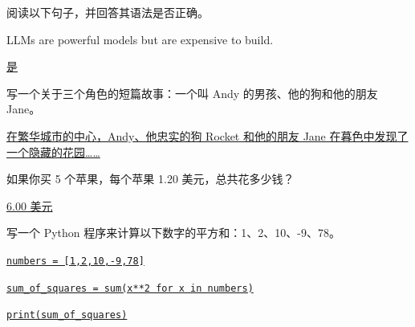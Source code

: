 \vspace{0.5em}
\begin{tcolorbox}
\begin{center}
\parbox{0.9\textwidth}{
{\color{blue} 阅读以下句子，并回答其语法是否正确。}

{\color{blue} LLMs are powerful models but are expensive to build.}

\vspace{0.3em}
\underline{是}
}
\end{center}
\end{tcolorbox}

\vspace{0.5em}
\begin{tcolorbox}
\begin{center}
\parbox{0.9\textwidth}{
{\color{blue} 写一个关于三个角色的短篇故事：一个叫 Andy 的男孩、他的狗和他的朋友 Jane。}

\vspace{0.3em}
\uline{在繁华城市的中心，Andy、他忠实的狗 Rocket 和他的朋友 Jane 在暮色中发现了一个隐藏的花园……}
}
\end{center}
\end{tcolorbox}

\vspace{0.5em}
\begin{tcolorbox}
\begin{center}
\parbox{0.9\textwidth}{
{\color{blue} 如果你买 5 个苹果，每个苹果 1.20 美元，总共花多少钱？}

\vspace{0.3em}
\underline{6.00 美元}
}
\end{center}
\end{tcolorbox}

\vspace{0.5em}
\begin{tcolorbox}
\begin{center}
\parbox{0.9\textwidth}{
{\color{blue} 写一个 Python 程序来计算以下数字的平方和：1、2、10、-9、78。}

\vspace{0.3em}
\underline{\texttt{numbers = [1,2,10,-9,78]}}

\underline{\texttt{sum\_of\_squares = sum(x**2 for x in numbers)}}

\underline{\texttt{print(sum\_of\_squares)}}
}
\end{center}
\end{tcolorbox}
\vspace{0.5em}


